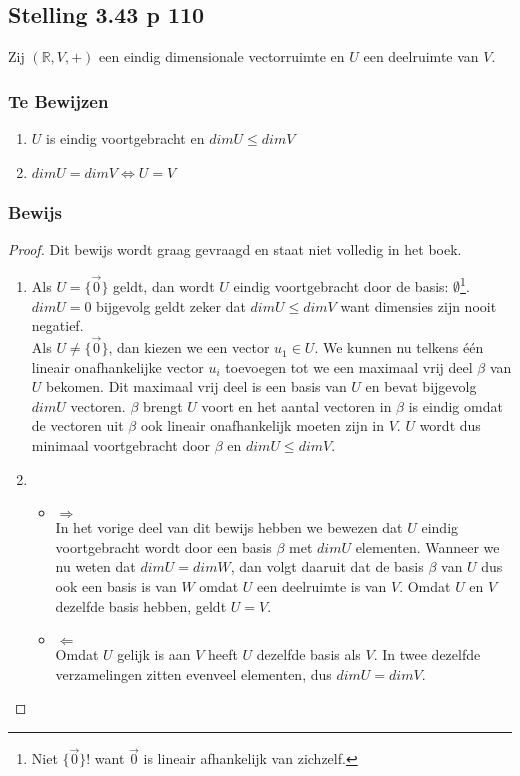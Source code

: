 \documentclass[lineaire_algebra_oplossingen.tex]{subfiles}
\begin{document}
\subsection{Stelling 3.43 p 110}
Zij $(\mathbb{R},V,+)$ een eindig dimensionale vectorruimte en $U$ een deelruimte van $V$.
\subsubsection*{Te Bewijzen}
\begin{enumerate}
\item $U$ is eindig voortgebracht en $dimU \le dimV$
\item $dimU=dimV \Leftrightarrow U = V$
\end{enumerate}
\subsubsection*{Bewijs}
\begin{proof}
Dit bewijs wordt graag gevraagd en staat niet volledig in het boek.
\begin{enumerate}
\item
Als $U=\{\vec{0}\}$ geldt, dan wordt $U$ eindig voortgebracht door de basis: $\emptyset$\footnote{Niet $\{\vec{0}\}$! want $\vec{0}$ is lineair afhankelijk van zichzelf.}. $dimU = 0$ bijgevolg geldt zeker dat $dimU\le dimV$ want dimensies zijn nooit negatief.\\
Als $U \neq \{\vec{0}\}$, dan kiezen we een vector $u_1 \in U$. We kunnen nu telkens \'e\'en lineair onafhankelijke vector $u_i$ toevoegen tot we een maximaal vrij deel $\beta$ van $U$ bekomen. Dit maximaal vrij deel is een basis van $U$ en bevat bijgevolg $dimU$ vectoren. $\beta$ brengt $U$ voort en het aantal vectoren in $\beta$ is eindig omdat de vectoren uit $\beta$ ook lineair onafhankelijk moeten zijn in $V$. $U$ wordt dus minimaal voortgebracht door $\beta$ en $dimU \le dimV$.
\item
\begin{itemize}
\item $\Rightarrow$\\
In het vorige deel van dit bewijs hebben we bewezen dat $U$ eindig voortgebracht wordt door een basis $\beta$ met $dimU$ elementen. Wanneer we nu weten dat $dimU=dimW$, dan volgt daaruit dat de basis $\beta$ van $U$ dus ook een basis is van $W$ omdat $U$ een deelruimte is van $V$. Omdat $U$ en $V$ dezelfde basis hebben, geldt $U = V$.
\item $\Leftarrow$\\
Omdat $U$ gelijk is aan $V$ heeft $U$ dezelfde basis als $V$. In twee dezelfde verzamelingen zitten evenveel elementen, dus $dimU=dimV$.
\end{itemize}
\end{enumerate}
\end{proof}
\end{document}
